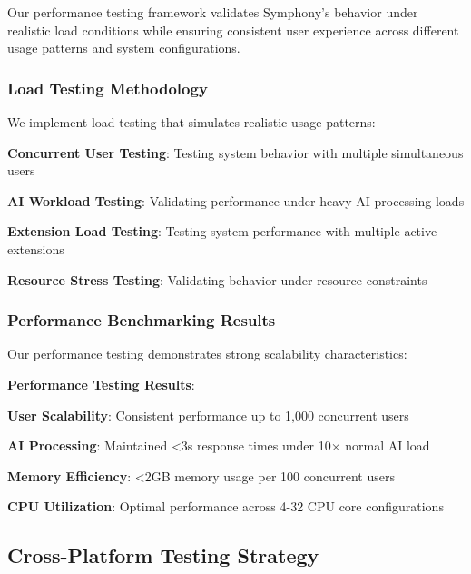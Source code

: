 Our performance testing framework validates Symphony's behavior under realistic load conditions while ensuring consistent user experience across different usage patterns and system configurations.

\subsubsection*{Load Testing Methodology}

We implement load testing that simulates realistic usage patterns:

\begin{compactlist}
    \item \textbf{Concurrent User Testing}: Testing system behavior with multiple simultaneous users
    \item \textbf{AI Workload Testing}: Validating performance under heavy AI processing loads
    \item \textbf{Extension Load Testing}: Testing system performance with multiple active extensions
    \item \textbf{Resource Stress Testing}: Validating behavior under resource constraints
\end{compactlist}

\subsubsection*{Performance Benchmarking Results}

Our performance testing demonstrates strong scalability characteristics:

\begin{successbox}
\textbf{Performance Testing Results}:
\begin{compactlist}
    \item \textbf{User Scalability}: Consistent performance up to 1,000 concurrent users
    \item \textbf{AI Processing}: Maintained <3s response times under 10× normal AI load
    \item \textbf{Memory Efficiency}: <2GB memory usage per 100 concurrent users
    \item \textbf{CPU Utilization}: Optimal performance across 4-32 CPU core configurations
\end{compactlist}
\end{successbox}

\subsection*{Cross-Platform Testing Strategy}


